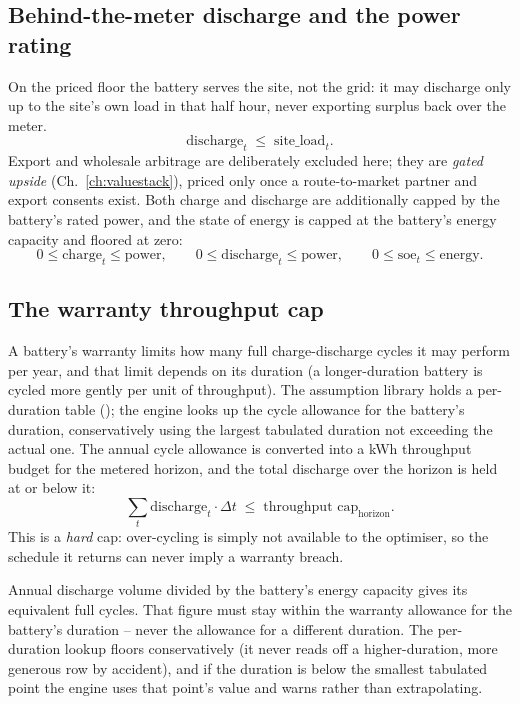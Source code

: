 \subsection{Behind-the-meter discharge and the power rating}

On the priced floor the battery serves the site, not the grid: it may discharge only up to the site's own load in that half hour, never exporting surplus back over the meter.
\[
\text{discharge}_t \;\le\; \text{site\_load}_t .
\]
Export and wholesale arbitrage are deliberately excluded here; they are \emph{gated upside} (Ch.~\ref{ch:valuestack}), priced only once a route-to-market partner and export consents exist. Both charge and discharge are additionally capped by the battery's rated power, and the state of energy is capped at the battery's energy capacity and floored at zero:
\[
0 \le \text{charge}_t \le \text{power}, \qquad
0 \le \text{discharge}_t \le \text{power}, \qquad
0 \le \text{soe}_t \le \text{energy}.
\]

\subsection{The warranty throughput cap}

A battery's warranty limits how many full charge-discharge cycles it may perform per year, and that limit depends on its duration (a longer-duration battery is cycled more gently per unit of throughput). The assumption library holds a per-duration table (); the engine looks up the cycle allowance for the battery's duration, conservatively using the largest tabulated duration not exceeding the actual one. The annual cycle allowance is converted into a kWh throughput budget for the metered horizon, and the total discharge over the horizon is held at or below it:
\[
\sum_t \text{discharge}_t \cdot \Delta t \;\le\; \text{throughput cap}_\text{horizon}.
\]
This is a \emph{hard} cap: over-cycling is simply not available to the optimiser, so the schedule it returns can never imply a warranty breach.

\begin{caution}
Annual discharge volume divided by the battery's energy capacity gives its equivalent full cycles. That figure must stay within the warranty allowance for the battery's duration -- never the allowance for a different duration. The per-duration lookup floors conservatively (it never reads off a higher-duration, more generous row by accident), and if the duration is below the smallest tabulated point the engine uses that point's value and warns rather than extrapolating.
\end{caution}

